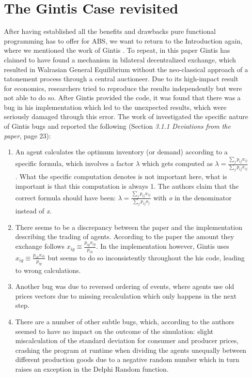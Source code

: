 \section{The Gintis Case revisited}
\label{sec:gintis_case} 
After having established all the benefits and drawbacks pure functional programming has to offer for ABS, we want to return to the Introduction again, where we mentioned the work of Gintis \cite{gintis_emergence_2006}. To repeat, in this paper Gintis has claimed to have found a mechanism in bilateral decentralized exchange, which resulted in Walrasian General Equilibrium without the neo-classical approach of a tatonement process through a central auctioneer. Due to its high-impact result for economics, researchers \cite{ionescu_dependently-typed_2012} tried to reproduce the results independently but were not able to do so. After Gintis provided the code, it was found that there was a bug in his implementation which led to the unexpected results, which were seriously damaged through this error. The work of \cite{evensen_extensible_2010} investigated the specific nature of Gintis bugs and reported the following (Section \textit{3.1.1  Deviations from the paper}, page 23):

\begin{enumerate}
	\item An agent calculates the optimum inventory (or demand) according to a specific formula, which involves a factor $\lambda$ which gets computed as $\lambda = \frac{\sum_{j}{} p_{ij}x_{ij}}{\sum_{j}{} p_{ij}x_{ij}}$. What the specific computation denotes is not important here, what is important is that this computation is always 1. The authors \cite{evensen_extensible_2010} claim that the correct formula should have been: $\lambda = \frac{\sum_{j}{} p_{ij}x_{ij}}{\sum_{j}{} p_{ij}o_{j}}$ with \textit{o} in the denominator instead of \textit{x}. 
	
	\item There seems to be a discrepancy between the paper and the implementation describing the trading of agents. According to the paper the amount they exchange follows $x_{ig} \equiv \frac{p_{ig}x_{ig}}{p_{ih}}$. In the implementation however, Gintis uses $x_{ig} \equiv \frac{p_{ih}x_{ih}}{p_{ig}}$ but seems to do so inconsistently throughout the his code, leading to wrong calculations.
	
	\item Another bug was due to reversed ordering of events, where agents use old prices vectors due to missing recalculation which only happens in the next step.

	\item There are a number of other subtle bugs, which, according to the authors \cite{evensen_extensible_2010} seemed to have no impact on the outcome of the simulation: slight miscalculation of the standard deviation for consumer and producer prices, crashing the program at runtime when dividing the agents unequally between different production goods due to a negative random number which in turn raises an exception in the Delphi Random function.

\end{enumerate}

